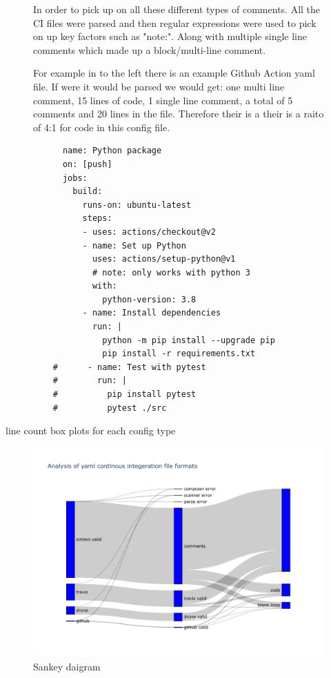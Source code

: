\documentclass[twoside,12pt,titlepage,a4paper]{article}
\begin{document}
\begin{figure}[!htbp]
  \centering
  \begin{minipage}[t]{.48\textwidth}
    In order to pick up on all these different types of comments. All the CI files were parsed and then regular expressions were used to pick on up key factors such as "note:". Along with multiple single line comments which made up a block/multi-line comment.

    For example in to the left there is an example Github Action yaml file. If were it would be parsed we would get: one multi line comment, 15 lines of code, 1 single line comment, a total of 5 comments and 20 lines in the file. Therefore their is a their is a raito of 4:1 for code in this config file.
  \end{minipage}%
  \hfill
  \begin{minipage}[t]{.48\textwidth}
    \begin{verbatim}
      name: Python package
      on: [push]
      jobs:
        build:
          runs-on: ubuntu-latest
          steps:
          - uses: actions/checkout@v2
          - name: Set up Python
            uses: actions/setup-python@v1
            # note: only works with python 3
            with:
              python-version: 3.8
          - name: Install dependencies
            run: |
              python -m pip install --upgrade pip
              pip install -r requirements.txt
    #      - name: Test with pytest
    #        run: |
    #          pip install pytest
    #          pytest ./src
      \end{verbatim}
  \end{minipage}
\end{figure}






line count box plots for each config type

\begin{figure}[h]
  \centering
  \includegraphics[width=\textwidth]{../src/results/sankey.pdf}
  \caption[alt text]{Sankey daigram}
\end{figure}
\end{document}

